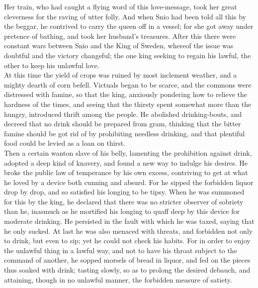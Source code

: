 \documentclass[10pt,a4paper]{report}
\begin{document}
Her train, who had caught a flying word of this love-message, took her great cleverness for the raving of utter folly. And when Snio had been told all this by the beggar, he contrived to carry the queen off in a vessel; for she got away under pretence of bathing, and took her husband's treasures. After this there were constant wars between Snio and the King of Sweden, whereof the issue was doubtful and the victory changeful; the one king seeking to regain his lawful, the other to keep his unlawful love.\\

At this time the yield of crops was ruined by most inclement weather, and a mighty dearth of corn befell. Victuals began to be scarce, and the commons were distressed with famine, so that the king, anxiously pondering how to relieve the hardness of the times, and seeing that the thirsty spent somewhat more than the hungry, introduced thrift among the people. He abolished drinking-bouts, and decreed that no drink should be prepared from gram, thinking that the bitter famine should be got rid of by prohibiting needless drinking, and that plentiful food could be levied as a loan on thirst.\\

Then a certain wanton slave of his belly, lamenting the prohibition against drink, adopted a deep kind of knavery, and found a new way to indulge his desires. He broke the public law of temperance by his own excess, contriving to get at what he loved by a device both cunning and absurd. For he sipped the forbidden liquor drop by drop, and so satisfied his longing to be tipsy. When he was summoned for this by the king, he declared that there was no stricter observer of sobriety than he, inasmuch as he mortified his longing to quaff deep by this device for moderate drinking. He persisted in the fault with which he was taxed, saying that he only sucked. At last he was also menaced with threats, and forbidden not only to drink, but even to sip; yet he could not check his habits. For in order to enjoy the unlawful thing in a lawful way, and not to have his throat subject to the command of another, he sopped morsels of bread in liquor, and fed on the pieces thus soaked with drink; tasting slowly, so as to prolong the desired debauch, and attaining, though in no unlawful manner, the forbidden measure of satiety.\\
\end{document}
